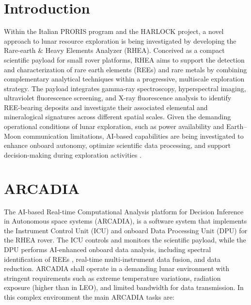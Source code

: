 \documentclass[11pt,twoside]{article}
\begin{document}


\section{Introduction}

Within the Italian PRORIS \citep{2025epsc.conf.1253T} program and the HARLOCK \citep{2026LPICo3160.1202T} project, a novel approach to lunar resource exploration is being investigated by developing the Rare-earth \& Heavy Elements Analyzer (RHEA). Conceived as a compact scientific payload for small rover platforms, RHEA aims to support the detection and characterization of rare earth elements (REEs) and rare metals by combining complementary analytical techniques within a progressive, multiscale exploration strategy. The payload integrates gamma-ray spectroscopy, hyperspectral imaging, ultraviolet fluorescence screening, and X-ray fluorescence analysis to identify REE-bearing deposits and investigate their associated elemental and mineralogical signatures across different spatial scales. Given the demanding operational conditions of lunar exploration, such as power availability and Earth--Moon communication limitations, AI-based capabilities are being investigated to enhance onboard autonomy, optimize scientific data processing, and support decision-making during exploration activities \citep{2025Parti...8..102B}.

\section{ARCADIA}

The AI-based Real-time Computational Analysis platform for Decision Inference in Autonomous space systems (ARCADIA), is a software system that implements the Instrument Control Unit (ICU) and onboard Data Processing Unit (DPU) for the RHEA rover. The ICU controls and monitors the scientific payload, while the DPU performs AI-enhanced onboard data analysis, including spectral identification of REEs \citep{luise_adass_2026}, real-time multi-instrument data fusion, and data reduction. ARCADIA shall operate in a demanding lunar environment with stringent requirements such as extreme temperature variations, radiation exposure (higher than in LEO), and limited bandwidth for data transmission. In this complex environment the main ARCADIA tasks are:
\end{document}
